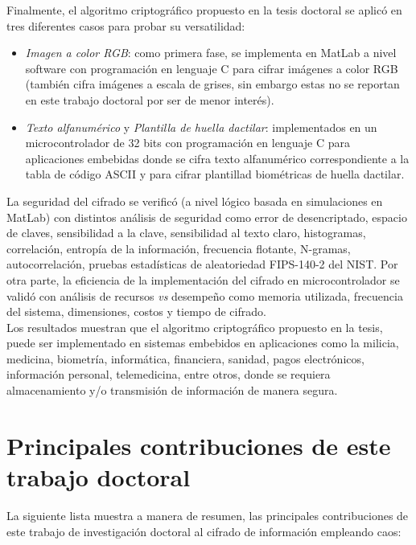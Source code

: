 Finalmente, el algoritmo criptográfico propuesto en la tesis doctoral se aplicó en tres diferentes casos para probar su versatilidad:
\begin{itemize}
\item \textit{Imagen a color RGB}: como primera fase, se implementa en MatLab a nivel software con programación en lenguaje C para cifrar imágenes a color RGB (también cifra imágenes a escala de grises, sin embargo estas no se reportan en este trabajo doctoral por ser de menor interés).
\item  \textit{Texto alfanumérico} y \textit{Plantilla de huella dactilar}: implementados en un microcontrolador de 32 bits con programación en lenguaje C para aplicaciones embebidas donde se cifra texto alfanumérico correspondiente a la tabla de código ASCII y para cifrar plantillad biométricas de huella dactilar.  \\  
\end{itemize} 

La seguridad del cifrado se verificó (a nivel lógico basada en simulaciones en MatLab) con distintos análisis de seguridad como error de desencriptado, espacio de claves, sensibilidad a la clave, sensibilidad al texto claro, histogramas, correlación, entropía de la información, frecuencia flotante, N-gramas, autocorrelación, pruebas estadísticas de aleatoriedad FIPS-140-2 del NIST. Por otra parte, la eficiencia de la implementación del cifrado en microcontrolador se validó con análisis de recursos \textit{vs} desempeño como memoria utilizada, frecuencia del sistema, dimensiones, costos y tiempo de cifrado.   \\ 

Los resultados muestran que el algoritmo criptográfico propuesto en la tesis, puede ser implementado en sistemas embebidos en aplicaciones como la milicia, medicina, biometría, informática, financiera, sanidad, pagos electrónicos, información personal, telemedicina, entre otros, donde se requiera almacenamiento y/o transmisión de información de manera segura.

\section{Principales contribuciones de este trabajo doctoral}
La siguiente lista muestra a manera de resumen, las principales contribuciones de este trabajo de investigación doctoral al cifrado de información empleando caos: \\

